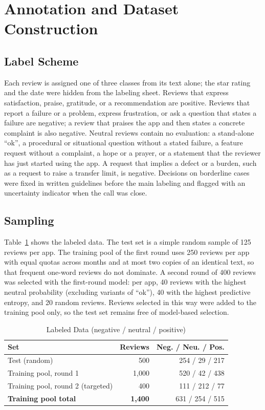 \documentclass[conference]{IEEEtran}
\begin{document}
\section{Annotation and Dataset Construction}\label{sec:annotation}
\subsection{Label Scheme}
Each review is assigned one of three classes from its text alone; the star rating and the date were hidden from the labeling sheet. Reviews that express satisfaction, praise, gratitude, or a recommendation are positive. Reviews that report a failure or a problem, express frustration, or ask a question that states a failure are negative; a review that praises the app and then states a concrete complaint is also negative. Neutral reviews contain no evaluation: a stand-alone ``ok'', a procedural or situational question without a stated failure, a feature request without a complaint, a hope or a prayer, or a statement that the reviewer has just started using the app. A request that implies a defect or a burden, such as a request to raise a transfer limit, is negative. Decisions on borderline cases were fixed in written guidelines before the main labeling and flagged with an uncertainty indicator when the call was close.

\subsection{Sampling}
Table~\ref{tab:splits} shows the labeled data. The test set is a simple random sample of 125 reviews per app. The training pool of the first round uses 250 reviews per app with equal quotas across months and at most two copies of an identical text, so that frequent one-word reviews do not dominate. A second round of 400 reviews was selected with the first-round model: per app, 40 reviews with the highest neutral probability (excluding variants of ``ok''), 40 with the highest predictive entropy, and 20 random reviews. Reviews selected in this way were added to the training pool only, so the test set remains free of model-based selection.

\begin{table}[htbp]
\caption{Labeled Data (negative / neutral / positive)}
\begin{center}
\footnotesize
\begin{tabular}{|l|r|r|}
\hline
\textbf{Set} & \textbf{Reviews} & \textbf{Neg. / Neu. / Pos.} \\
\hline
Test (random) & 500 & 254 / 29 / 217 \\
Training pool, round 1 & 1,000 & 520 / 42 / 438 \\
Training pool, round 2 (targeted) & 400 & 111 / 212 / 77 \\
\hline
\textbf{Training pool total} & \textbf{1,400} & 631 / 254 / 515 \\
\hline
\end{tabular}
\label{tab:splits}
\end{center}
\end{table}
\end{document}
